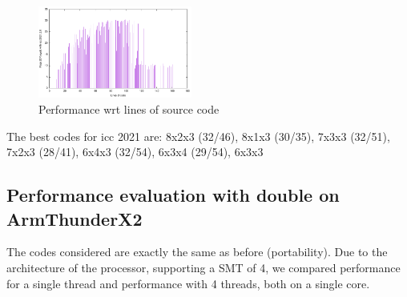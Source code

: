 \documentclass[sigconf,review]{acmart}
\begin{document}
\begin{figure}[ht]
  \includegraphics[width=0.45\textwidth]{../benches/gemm/cascadelake-64x256x64/icc21loc.pdf}
  \caption{Performance wrt lines of source code}
\end{figure}
The best codes for icc 2021 are: 8x2x3 (32/46), 8x1x3 (30/35), 7x3x3 (32/51), 7x2x3 (28/41), 6x4x3 (32/54), 6x3x4 (29/54), 6x3x3


\subsection{Performance evaluation with double on ArmThunderX2}
The codes considered are exactly the same as before (portability).  Due to the architecture of the processor, supporting a SMT of 4, we compared performance for a single thread and performance with 4 threads, both on a single core. 
\end{document}
